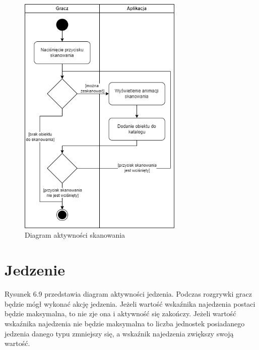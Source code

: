 \begin{figure}[H]
    \centering
        \includegraphics[width=0.7\textwidth]{Graphics/activities/scan.png}
         \caption{Diagram aktywności skanowania}
\end{figure}

\clearpage

\section{Jedzenie}

Rysunek 6.9 przedstawia diagram aktywności jedzenia.
Podczas rozgrywki gracz będzie mógł wykonać akcję jedzenia. Jeżeli wartość wskaźnika najedzenia postaci będzie maksymalna, to nie zje ona i aktywność się zakończy. Jeżeli wartość wskaźnika najedzenia nie będzie maksymalna to liczba jednostek posiadanego jedzenia danego typu zmniejszy się, a wskaźnik najedzenia zwiększy swoją wartość.

